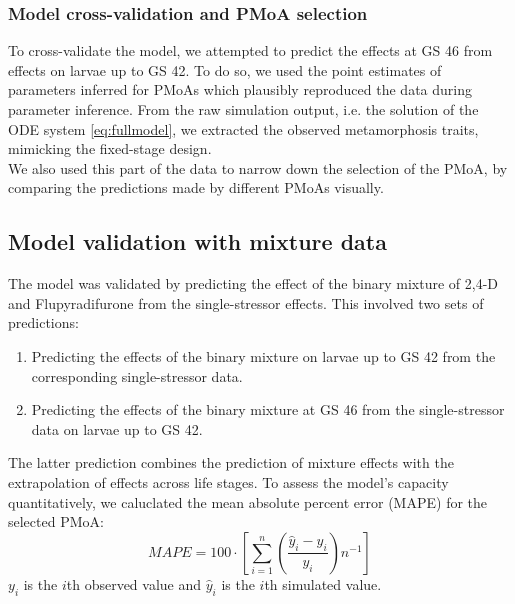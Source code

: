 \subsubsection{Model cross-validation and PMoA selection}
%
To cross-validate the model, we attempted to predict the effects at GS 46 from effects on larvae up to GS 42. 
To do so, we used the point estimates of parameters inferred for PMoAs which plausibly reproduced the data during parameter inference. 
From the raw simulation output, i.e. the solution of the ODE system \ref{eq:fullmodel}, 
we extracted the observed metamorphosis traits, mimicking the fixed-stage design. \\ 
We also used this part of the data to narrow down the selection of the PMoA, 
by comparing the predictions made by different PMoAs visually. 
\subsection{Model validation with mixture data}
%
The model was validated by predicting the effect of the binary mixture of 2,4-D and Flupyradifurone from 
the single-stressor effects.
This involved two sets of predictions: 
\begin{enumerate}
    \item Predicting the effects of the binary mixture on larvae up to GS 42 from the corresponding single-stressor data.
    \item Predicting the effects of the binary mixture at GS 46 from the single-stressor data on larvae up to GS 42.
\end{enumerate}
%
The latter prediction combines the prediction of mixture effects with the extrapolation of effects across life stages.
%
To assess the model's capacity quantitatively, we caluclated the mean absolute percent error (MAPE) 
for the selected PMoA: 
\begin{equation}
    MAPE = 100 \cdot \left[ \sum\limits_{i=1}^{n} \left( \dfrac{\hat{y}_i - y_i}{y_i} \right) n^{-1}  \right]
    \label{eq:mape}
\end{equation}
%
$y_i$ is the $i$th observed value and $\hat{y}_i$ is the $i$th simulated value.
